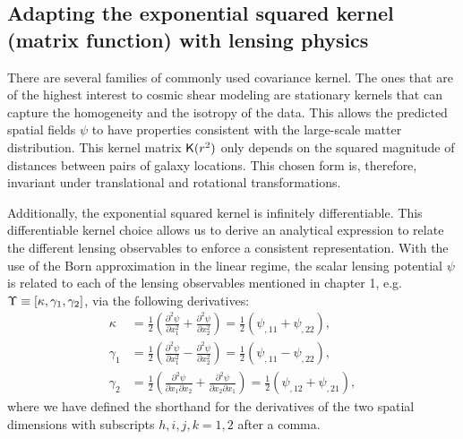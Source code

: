 \subsection{Adapting the exponential squared kernel (matrix function) with lensing physics}
There are several families of commonly used covariance kernel.
The ones that are of the highest interest to cosmic shear modeling 
are stationary kernels that can capture 
the homogeneity and the isotropy of the data. This allows the predicted spatial fields
$\psi$ to have properties consistent with the large-scale matter distribution.
%
This kernel matrix $\mathsf{K}(r^2)$ only depends on the
squared magnitude of distances between pairs of galaxy locations. 
This chosen form is, therefore, invariant
under translational and rotational transformations.

Additionally, the exponential squared kernel is infinitely differentiable. This
differentiable kernel choice allows us to derive an analytical expression to
relate the different lensing observables to enforce a consistent representation.  
With the use of the Born approximation in the linear regime, the scalar lensing potential $\psi$ is related to 
each of the lensing observables mentioned in chapter 1, e.g. 
$\Upsilon \equiv [\kappa, \gamma_1, \gamma_2]$, via the following derivatives:
\begin{align}
\kappa &= \frac{1}{2}\left(\frac{\partial^2 \psi}{\partial x_1^2} +
\frac{\partial^2 \psi}{\partial x_2^2 }\right) 
= \frac{1}{2} (\psi_{,11} + \psi_{,22}),\\ 
\gamma_1 
&=\frac{1}{2}\left(\frac{\partial^2 \psi}{\partial x_1^2} - 
\frac{\partial^2 \psi}{\partial x_2^2}\right) 
= \frac{1}{2} (\psi_{,11} - \psi_{,22}), \\
\gamma_2 
&=\frac{1}{2}\left(\frac{\partial^2 \psi}{\partial x_1 \partial
x_2} + \frac{\partial^2 \psi}{\partial x_2 \partial x_1}\right)
= \frac{1}{2} (\psi_{,12} + \psi_{,21}), 
\end{align}
where we have defined the shorthand for the derivatives of the two spatial dimensions with
subscripts $h,i,j,k = 1, 2$ after a comma.

